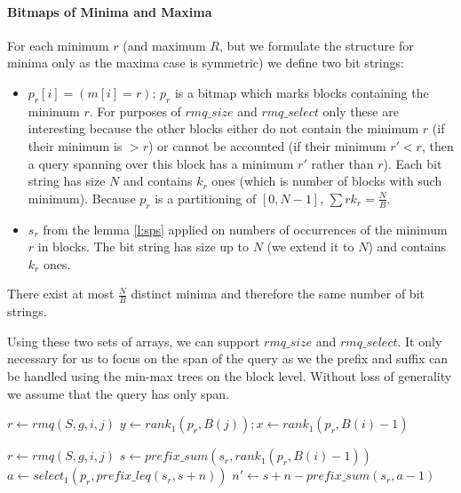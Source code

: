 \paragraph{Bitmaps of Minima and Maxima}

For each minimum $r$ (and maximum $R$, but we formulate the structure for minima only as the maxima case is symmetric) we define two bit strings:
\begin{itemize}
	\item $p_r[i] = (m[i] = r)$; $p_r$ is a bitmap which marks blocks containing the minimum $r$.
	For purposes of $rmq\_size$ and $rmq\_select$ only these are interesting because the other blocks either do not contain the minimum $r$ (if their minimum is $> r$) or cannot be accounted (if their minimum $r' < r$, then a query spanning over this block has a minimum $r'$ rather than $r$).
	Each bit string has size $N$ and contains $k_r$ ones (which is number of blocks with such minimum).
	Because $p_r$ is a partitioning of $[0, N - 1]$, $\sum{r} k_r = \frac{N}{B}$.
	\item $s_r$ from the lemma \ref{l:sps} applied on numbers of occurrences of the minimum $r$ in blocks.
	The bit string has size up to $N$ (we extend it to $N$) and contains $k_r$ ones.
\end{itemize}
There exist at most $\frac{N}{B}$ distinct minima and therefore the same number of bit strings.

Using these two sets of arrays, we can support $rmq\_size$ and $rmq\_select$.
It only necessary for us to focus on the span of the query as we the prefix and suffix can be handled using the min-max trees on the block level.
Without loss of generality we assume that the query has only span.

\begin{algorithmic}
	\State $r \gets rmq(S, g, i, j)$
	\State $y \gets rank_1(p_r, B(j)); x \gets rank_1(p_r, B(i) - 1)$
	\State {}
\EndFunction
\end{algorithmic}

\begin{algorithmic}
	\State $r \gets rmq(S, g, i, j)$
	\State $s \gets prefix\_sum(s_r, rank_1(p_r, B(i) - 1))$ 
	\State $a \gets select_1(p_r, prefix\_leq(s_r, s + n))$ 
	\State $n' \gets s + n - prefix\_sum(s_r, a - 1)$ 
	\State {}
\EndFunction
\end{algorithmic}

